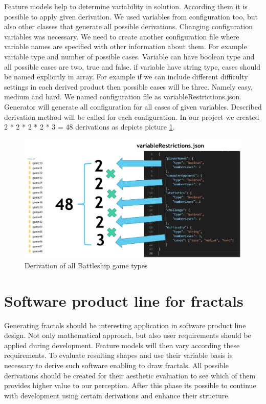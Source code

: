 \documentclass[11pt,english,a4paper,twoside]{article}
\begin{document}
Feature models help to determine variability in solution. According them it is possible to apply given derivation. We used variables from configuration too, but also other classes that generate all possible derivations. Changing configuration variables was necessary. We need to create another configuration file where variable names are specified with other information about them. For example variable type and number of possible cases. Variable can have boolean type and all possible cases are two, true and false. if variable have string type, cases should be named explicitly in array. For example if we can include different difficulty settings in each derived product then possible cases will be three. Namely easy, medium and hard. We named configuration file as variableRestrictions.json. Generator will generate all configuration for all cases of given variables. Described derivation method will be called for each configuration. In our project we created 2 * 2 * 2 * 2 * 3 = 48 derivations as depicts picture \ref{derivationBattleshipTypes}.  

\begin{figure}[!t]  %
					\begin{center}
									\includegraphics[width=\linewidth]{fig/allCases.png}
									\caption{Derivation of all Battleship game types}
									\label{derivationBattleshipTypes}
					\end{center}
\end{figure}


\section{Software product line for fractals} \label{fractalProductLine}

Generating fractals should be interesting application in software product line design. Not only mathematical approach, but also user requirements should be applied during development. Feature models will then vary according these requirements. To evaluate resulting shapes and use their variable basis is necessary to derive such software enabling to draw fractals. All possible derivations should be created for their aesthetic evaluation to see which of them provides higher value to our perception. After this phase its possible to continue with development using certain derivations and enhance their structure.
\end{document}
